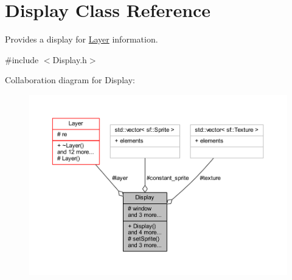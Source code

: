 \hypertarget{class_display}{}\section{Display Class Reference}
\label{class_display}


Provides a display for \hyperlink{class_layer}{Layer} information.  




{\ttfamily \#include $<$Display.\+h$>$}



Collaboration diagram for Display\+:
\nopagebreak
\begin{figure}[H]
\begin{center}
\leavevmode
\includegraphics[width=350pt]{class_display__coll__graph}
\end{center}
\end{figure}
